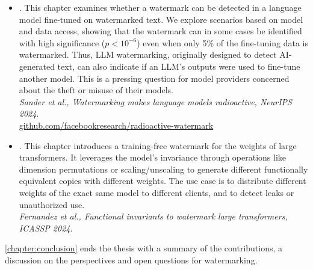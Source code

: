 \begin{itemize}
    \item {}.
        This chapter examines whether a watermark can be detected in a language model fine-tuned on watermarked text. 
        We explore scenarios based on model and data access, showing that the watermark can in some cases be identified with high significance ($p<10^{-6}$) even when only 5\% of the fine-tuning data is watermarked. 
        Thus, LLM watermarking, originally designed to detect AI-generated text, can also indicate if an LLM's outputs were used to fine-tune another model. 
        This is a pressing question for model providers concerned about the theft or misuse of their models.
        \\ \basedon
        \textit{Sander et al., Watermarking makes language models radioactive, NeurIPS 2024}.
        \\ \codeat
        \url{github.com/facebookresearch/radioactive-watermark}
    \item {}.
        This chapter introduces a training-free watermark for the weights of large transformers.
        It leverages the model's invariance through operations like dimension permutations or scaling/unscaling to generate different functionally equivalent copies with different weights. 
        The use case is to distribute different weights of the exact same model to different clients, and to detect leaks or unauthorized use.
        \\ \basedon
        \textit{Fernandez et al., Functional invariants to watermark large transformers, ICASSP 2024}.
\end{itemize}

\autoref{chapter:conclusion} ends the thesis with a summary of the contributions, a discussion on the perspectives and open questions for watermarking.
